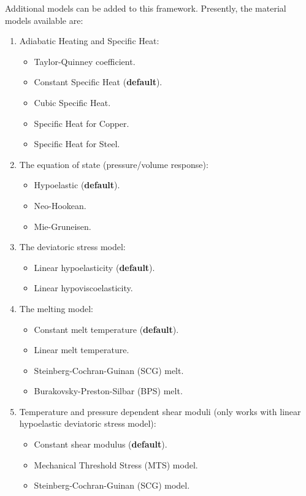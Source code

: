 Additional models can be added to this framework.  Presently, the
material models available are:
\begin{enumerate}
    \item Adiabatic Heating and Specific Heat:
      \begin{itemize}
        \item Taylor-Quinney coefficient.
        \item Constant Specific Heat ({\bf default}).
        \item Cubic Specific Heat.
        \item Specific Heat for Copper.
        \item Specific Heat for Steel.
      \end{itemize}
    \item The equation of state (pressure/volume response):
      \begin{itemize}
        \item Hypoelastic ({\bf default}).
        \item Neo-Hookean.
        \item Mie-Gruneisen.
      \end{itemize}
    \item The deviatoric stress model:
      \begin{itemize}
        \item Linear hypoelasticity ({\bf default}).
        \item Linear hypoviscoelasticity.
      \end{itemize}
    \item The melting model:
      \begin{itemize}
        \item Constant melt temperature ({\bf default}).
        \item Linear melt temperature.
        \item Steinberg-Cochran-Guinan (SCG) melt.
        \item Burakovsky-Preston-Silbar (BPS) melt.
      \end{itemize}
    \item Temperature and pressure dependent shear moduli (only works
      with linear hypoelastic deviatoric stress model):
      \begin{itemize}
        \item Constant shear modulus ({\bf default}).
        \item Mechanical Threshold Stress (MTS) model.
        \item Steinberg-Cochran-Guinan (SCG) model.

\end{itemize}
\end{enumerate}
